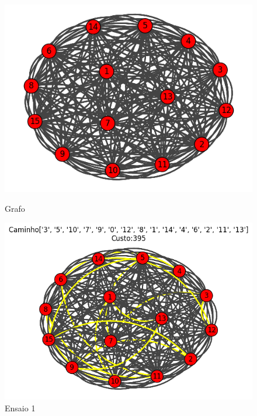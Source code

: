 \documentclass[12pt]{article}
\begin{document}
\begin{figure}[h!]
    \begin{minipage}{0.35\textwidth}
        \centering
        \includegraphics[width=\linewidth]{imgs/grafo_completo.png}
        \caption{Grafo}
        \label{grafo}
    \end{minipage}
    \hfill
    \begin{minipage}{0.4\textwidth}
        \centering
        \includegraphics[width=\linewidth]{imgs/grafo_ensaio1.png}
        \caption{Ensaio 1}
        \label{ensaio1}
    \end{minipage}
    

\end{figure}
\end{document}
